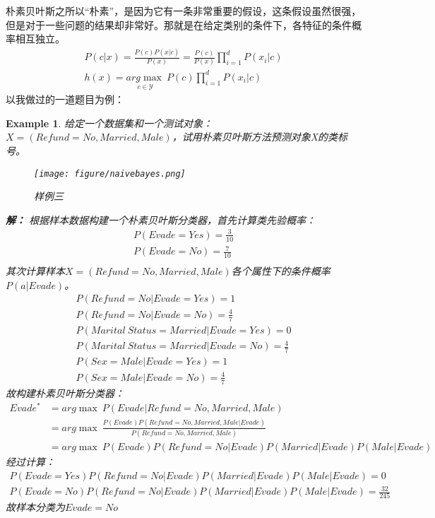 \documentclass[twoside]{article}
\newtheorem{example}{Example}
\begin{document}
朴素贝叶斯之所以“朴素”，是因为它有一条非常重要的假设，这条假设虽然很强，但是对于一些问题的结果却非常好。那就是在给定类别的条件下，各特征的条件概率相互独立。
\begin{equation*}
    \begin{aligned}
        P(c|x)=\frac{P(c)P(x|c)}{P(x)}=\frac{P(c)}{P(x)}\prod_{i=1}^d P(x_i|c)\\
        h(x)=\underset{c \in \mathcal{Y}}{arg\max}\ P(c)\prod_{i=1}^d P(x_i|c)
    \end{aligned}
\end{equation*}
以我做过的一道题目为例：
\begin{example}
    给定一个数据集和一个测试对象：
$X=(Refund = No, Married, Male)$，试用朴素贝叶斯方法预测对象X的类标号。
\begin{figure}[h]
    \centering
    \texttt{[image: figure/naivebayes.png]}
    \caption{样例三}
\end{figure}

\textbf{解：}
根据样本数据构建一个朴素贝叶斯分类器，首先计算类先验概率：
\begin{equation*}
    \begin{aligned}
        P(Evade=Yes)=\frac{3}{10}\\
        P(Evade=No)=\frac{7}{10}\\
    \end{aligned}
\end{equation*}
其次计算样本$X=(Refund = No, Married, Male)$各个属性下的条件概率$P(a|Evade)$。
\begin{equation*}
    \begin{aligned}
        P(Refund=No|Evade=Yes)=1\\
        P(Refund=No|Evade=No)=\frac{4}{7}\\
        P(Marital\ Status=Married|Evade=Yes)=0\\
        P(Marital\ Status=Married|Evade=No)=\frac{4}{7} \\
        P(Sex=Male|Evade=Yes)= 1\\
        P(Sex=Male|Evade=No)=\frac{4}{7}
    \end{aligned}
\end{equation*}
故构建朴素贝叶斯分类器：
\begin{equation*}
    \begin{aligned}
        Evade^*&=arg\max\ P(Evade|Refund = No, Married, Male)\\
        &=arg\max \ \frac{P(Evade)P(Refund = No, Married, Male|Evade)}{P(Refund = No, Married, Male)}\\
        &=arg\max \ P(Evade)P(Refund = No|Evade)P(Married|Evade)P(Male|Evade)
    \end{aligned}
\end{equation*}
经过计算：\begin{equation*}
    \begin{aligned}
        P(Evade=Yes)P(Refund = No|Evade)P(Married|Evade)P(Male|Evade)=0\\
        P(Evade=No)P(Refund = No|Evade)P(Married|Evade)P(Male|Evade)=\frac{32}{245}
    \end{aligned}
\end{equation*}
故样本分类为$Evade=No$
\end{example}
\end{document}
